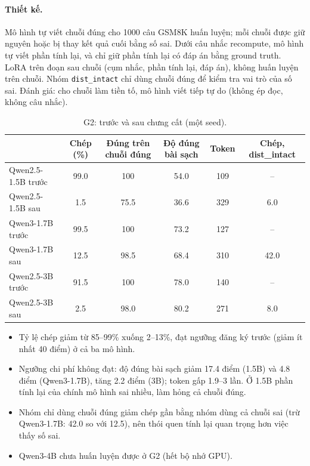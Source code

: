 \documentclass[11pt]{article}
\begin{document}
\paragraph{Thiết kế.} Mô hình tự viết chuỗi đúng cho 1000 câu GSM8K huấn luyện; mỗi chuỗi được giữ nguyên hoặc
bị thay kết quả cuối bằng số sai. Dưới câu nhắc recompute, mô hình tự viết phần tính lại, và chỉ giữ phần
tính lại có đáp án bằng ground truth. LoRA trên đoạn sau chuỗi (cụm nhắc, phần tính lại, đáp án), không
huấn luyện trên chuỗi. Nhóm \texttt{dist\_intact} chỉ dùng chuỗi đúng để kiểm tra vai trò của số sai.
Đánh giá: cho chuỗi làm tiền tố, mô hình viết tiếp tự do (không ép đọc, không câu nhắc).

\begin{table}[h]
\centering\small
\caption{G2: trước và sau chưng cất (một seed).}
\begin{tabular}{lccccc}
\toprule
 & Chép (\%) & Đúng trên chuỗi đúng & Độ đúng bài sạch & Token & Chép, dist\_intact \\
\midrule
Qwen2.5-1.5B trước & 99.0 & 100 & 54.0 & 109 & -- \\
Qwen2.5-1.5B sau & 1.5 & 75.5 & 36.6 & 329 & 6.0 \\
Qwen3-1.7B trước & 99.5 & 100 & 73.2 & 127 & -- \\
Qwen3-1.7B sau & 12.5 & 98.5 & 68.4 & 310 & 42.0 \\
Qwen2.5-3B trước & 91.5 & 100 & 78.0 & 140 & -- \\
Qwen2.5-3B sau & 2.5 & 98.0 & 80.2 & 271 & 8.0 \\
\bottomrule
\end{tabular}
\end{table}

\begin{cachdoc}
\begin{itemize}[leftmargin=*,itemsep=1pt]
\item Tỷ lệ chép giảm từ 85--99\% xuống 2--13\%, đạt ngưỡng đăng ký trước (giảm ít nhất 40 điểm) ở cả ba mô hình.
\item Ngưỡng chi phí không đạt: độ đúng bài sạch giảm 17.4 điểm (1.5B) và 4.8 điểm (Qwen3-1.7B), tăng 2.2
  điểm (3B); token gấp 1.9--3 lần. Ở 1.5B phần tính lại của chính mô hình sai nhiều, làm hỏng cả chuỗi đúng.
\item Nhóm chỉ dùng chuỗi đúng giảm chép gần bằng nhóm dùng cả chuỗi sai (trừ Qwen3-1.7B: 42.0 so với 12.5),
  nên thói quen tính lại quan trọng hơn việc thấy số sai.
\item Qwen3-4B chưa huấn luyện được ở G2 (hết bộ nhớ GPU).
\end{itemize}
\end{cachdoc}
\end{document}
